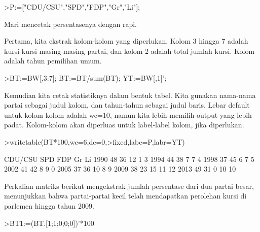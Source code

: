 \documentclass[12pt,arial,letterpaper]{book}
\begin{document}
\begin{eulercomment}
\begin{eulercomment}
\begin{eulercomment}
\begin{eulercomment}
\begin{eulercomment}
\begin{eulercomment}
\begin{eulercomment}
\begin{eulercomment}
\begin{eulercomment}
\begin{eulercomment}
\begin{eulercomment}
\begin{eulercomment}
\begin{eulercomment}
\begin{eulercomment}
\begin{eulercomment}
\begin{eulercomment}
\begin{eulercomment}
\begin{eulercomment}
\begin{eulercomment}
\begin{eulercomment}
\begin{eulercomment}
\begin{eulercomment}
\begin{eulercomment}
\begin{eulercomment}
\begin{eulercomment}
\begin{eulercomment}
\begin{eulercomment}
\begin{eulercomment}
\begin{eulercomment}
\begin{eulercomment}
\begin{eulercomment}
\begin{eulercomment}
\begin{eulerprompt}
>P:=["CDU/CSU","SPD","FDP","Gr","Li"];
\end{eulerprompt}
\begin{eulercomment}
Mari mencetak persentasenya dengan rapi.

Pertama, kita ekstrak kolom-kolom yang diperlukan. Kolom 3 hingga 7
adalah kursi-kursi masing-masing partai, dan kolom 2 adalah total
jumlah kursi. Kolom adalah tahun pemilihan umum.
\end{eulercomment}
\begin{eulerprompt}
>BT:=BW[,3:7]; BT:=BT/sum(BT); YT:=BW[,1]';
\end{eulerprompt}
\begin{eulercomment}
Kemudian kita cetak statistiknya dalam bentuk tabel. Kita gunakan
nama-nama partai sebagai judul kolom, dan tahun-tahun sebagai judul
baris. Lebar default untuk kolom-kolom adalah wc=10, namun kita lebih
memilih output yang lebih padat. Kolom-kolom akan diperluas untuk
label-label kolom, jika diperlukan.
\end{eulercomment}
\begin{eulerprompt}
>writetable(BT*100,wc=6,dc=0,>fixed,labc=P,labr=YT)
\end{eulerprompt}
\begin{euleroutput}
         CDU/CSU   SPD   FDP    Gr    Li
    1990      48    36    12     1     3
    1994      44    38     7     7     4
    1998      37    45     6     7     5
    2002      41    42     8     9     0
    2005      37    36    10     8     9
    2009      38    23    15    11    12
    2013      49    31     0    10    10
\end{euleroutput}
\begin{eulercomment}
Perkalian matriks berikut mengekstrak jumlah persentase dari dua
partai besar, menunjukkan bahwa partai-partai kecil telah mendapatkan
perolehan kursi di parlemen hingga tahun 2009.
\end{eulercomment}
\begin{eulerprompt}
>BT1:=(BT.[1;1;0;0;0])'*100

\end{eulerprompt}
\end{eulercomment}
\end{eulercomment}
\end{eulercomment}
\end{eulercomment}
\end{eulercomment}
\end{eulercomment}
\end{eulercomment}
\end{eulercomment}
\end{eulercomment}
\end{eulercomment}
\end{eulercomment}
\end{eulercomment}
\end{eulercomment}
\end{eulercomment}
\end{eulercomment}
\end{eulercomment}
\end{eulercomment}
\end{eulercomment}
\end{eulercomment}
\end{eulercomment}
\end{eulercomment}
\end{eulercomment}
\end{eulercomment}
\end{eulercomment}
\end{eulercomment}
\end{eulercomment}
\end{eulercomment}
\end{eulercomment}
\end{eulercomment}
\end{eulercomment}
\end{eulercomment}
\end{eulercomment}
\end{document}
